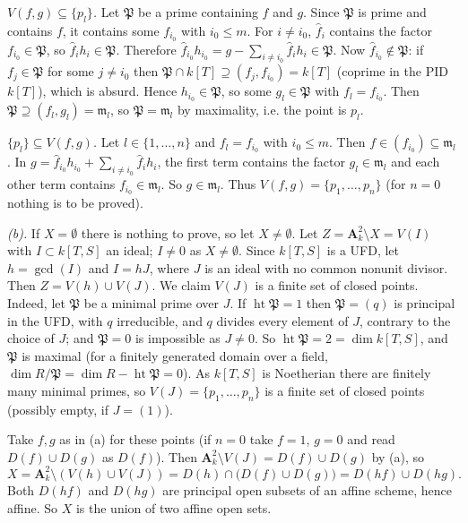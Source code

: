 \documentclass[11pt]{article}
\begin{document}
\emph{$V(f,g)\subseteq\{p_l\}$.} Let $\mathfrak P$ be a prime containing $f$ and $g$. Since $\mathfrak P$ is prime and contains $f$, it contains some $f_{i_0}$ with $i_0\le m$. For $i\ne i_0$, $\hat f_i$ contains the factor $f_{i_0}\in\mathfrak P$, so $\hat f_ih_i\in\mathfrak P$. Therefore $\hat f_{i_0}h_{i_0}=g-\sum_{i\ne i_0}\hat f_ih_i\in\mathfrak P$. Now $\hat f_{i_0}\notin\mathfrak P$: if $f_j\in\mathfrak P$ for some $j\ne i_0$ then $\mathfrak P\cap k[T]\supseteq(f_j,f_{i_0})=k[T]$ (coprime in the PID $k[T]$), which is absurd. Hence $h_{i_0}\in\mathfrak P$, so some $g_l\in\mathfrak P$ with $f_l=f_{i_0}$. Then $\mathfrak P\supseteq(f_l,g_l)=\mathfrak m_l$, so $\mathfrak P=\mathfrak m_l$ by maximality, i.e. the point is $p_l$.

\emph{$\{p_l\}\subseteq V(f,g)$.} Let $l\in\{1,\dots,n\}$ and $f_l=f_{i_0}$ with $i_0\le m$. Then $f\in(f_{i_0})\subseteq\mathfrak m_l$. In $g=\hat f_{i_0}h_{i_0}+\sum_{i\ne i_0}\hat f_ih_i$, the first term contains the factor $g_l\in\mathfrak m_l$ and each other term contains $f_{i_0}\in\mathfrak m_l$. So $g\in\mathfrak m_l$. Thus $V(f,g)=\{p_1,\dots,p_n\}$ (for $n=0$ nothing is to be proved).

\emph{(b).} If $X=\emptyset$ there is nothing to prove, so let $X\ne\emptyset$. Let $Z=\mathbf A^2_k\setminus X=V(I)$ with $I\subset k[T,S]$ an ideal; $I\ne0$ as $X\ne\emptyset$. Since $k[T,S]$ is a UFD, let $h=\gcd(I)$ and $I=hJ$, where $J$ is an ideal with no common nonunit divisor. Then $Z=V(h)\cup V(J)$. We claim $V(J)$ is a finite set of closed points. Indeed, let $\mathfrak P$ be a minimal prime over $J$. If $\operatorname{ht}\mathfrak P=1$ then $\mathfrak P=(q)$ is principal in the UFD, with $q$ irreducible, and $q$ divides every element of $J$, contrary to the choice of $J$; and $\mathfrak P=0$ is impossible as $J\ne0$. So $\operatorname{ht}\mathfrak P=2=\dim k[T,S]$, and $\mathfrak P$ is maximal (for a finitely generated domain over a field, $\dim R/\mathfrak P=\dim R-\operatorname{ht}\mathfrak P=0$). As $k[T,S]$ is Noetherian there are finitely many minimal primes, so $V(J)=\{p_1,\dots,p_n\}$ is a finite set of closed points (possibly empty, if $J=(1)$).

Take $f,g$ as in (a) for these points (if $n=0$ take $f=1$, $g=0$ and read $D(f)\cup D(g)$ as $D(f)$). Then $\mathbf A^2_k\setminus V(J)=D(f)\cup D(g)$ by (a), so
\[ X=\mathbf A^2_k\setminus(V(h)\cup V(J))=D(h)\cap\bigl(D(f)\cup D(g)\bigr)=D(hf)\cup D(hg). \]
Both $D(hf)$ and $D(hg)$ are principal open subsets of an affine scheme, hence affine. So $X$ is the union of two affine open sets.
\end{document}
